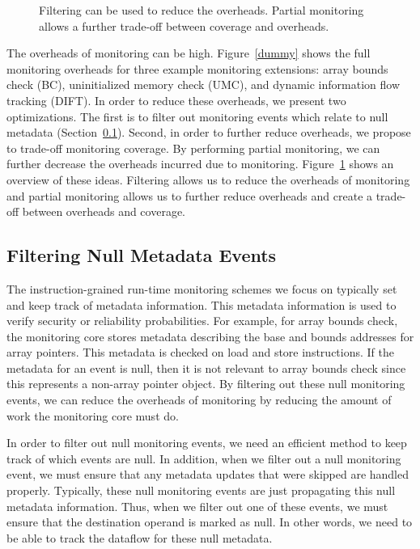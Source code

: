 \begin{figure}
\begin{center}
    \vspace{-0.2in}
    \caption{Filtering can be used to reduce the overheads. Partial monitoring
    allows a further trade-off between coverage and overheads.}
    \label{fig:optimizations.overview}
    \vspace{-0.1in}
  \end{center}
\end{figure}

The overheads of monitoring can be high. Figure~\ref{dummy} shows the full
monitoring overheads for three example monitoring extensions: array bounds
check (BC), uninitialized memory check (UMC), and dynamic information flow
tracking (DIFT). In order to reduce these overheads, we present two
optimizations. The first is to filter out monitoring events which relate to
null metadata (Section~\ref{sec:optimizations.filter}). Second, in order to
further reduce overheads, we propose to trade-off monitoring coverage. By
performing partial monitoring, we can further decrease the overheads incurred
due to monitoring. Figure~\ref{fig:optimizations.overview} shows an overview of
these ideas. Filtering allows us to reduce the overheads of monitoring and
partial monitoring allows us to further reduce overheads and create a trade-off
between overheads and coverage.

\subsection{Filtering Null Metadata Events}
\label{sec:optimizations.filter}

The instruction-grained run-time monitoring schemes we focus on typically set
and keep track of metadata information. This metadata information is used to
verify security or reliability probabilities. For example, for array bounds
check, the monitoring core stores metadata describing the base and bounds
addresses for array pointers. This metadata is checked on load and store
instructions. If the metadata for an event is null, then it is not relevant to
array bounds check since this represents a non-array pointer object. By
filtering out these null monitoring events, we can reduce the overheads of
monitoring by reducing the amount of work the monitoring core must do.

In order to filter out null monitoring events, we need an efficient method to
keep track of which events are null. In addition, when we filter out a null
monitoring event, we must ensure that any metadata updates that were skipped
are handled properly. Typically, these null monitoring events are just
propagating this null metadata information. Thus, when we filter out one of
these events, we must ensure that the destination operand is marked as null. In
other words, we need to be able to track the dataflow for these null metadata.

